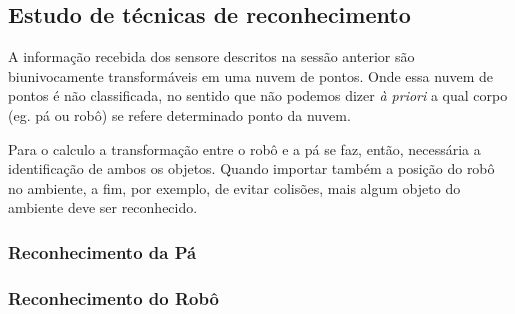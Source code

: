 \subsection{Estudo de técnicas de reconhecimento} 

A informação recebida dos sensore descritos na sessão anterior são
biunivocamente transformáveis em uma nuvem de pontos. Onde essa nuvem de pontos
é não classificada, no sentido que não podemos dizer \textit{à priori} a qual
corpo (eg. pá ou robô) se refere determinado ponto da nuvem.

Para o calculo a transformação entre o robô e a pá se faz, então, necessária a
identificação de ambos os objetos. Quando importar também a posição do robô no
ambiente, a fim, por exemplo, de evitar colisões, mais algum objeto do ambiente
deve ser reconhecido.

\subsubsection{Reconhecimento da Pá} 


\subsubsection{Reconhecimento do Robô}